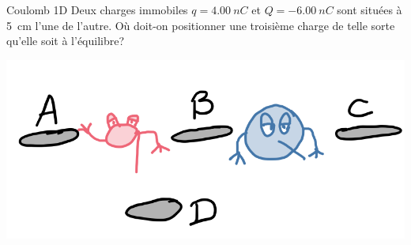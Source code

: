 \documentclass{beamer}
\begin{document}
\begin{frame}{Coulomb 1D}
  Deux charges immobiles $q = \SI{4.00}{nC}$ et $Q = \SI{-6.00}{nC}$ sont
  situées à \SI{5}{cm} l'une de l'autre.  Où doit-on positionner une troisième
  charge de telle sorte qu'elle soit à l'équilibre?
  \begin{center}
    \includegraphics[scale=0.4]{figures/petitq-grosq.png}
  \end{center}
\end{frame}
\end{document}
